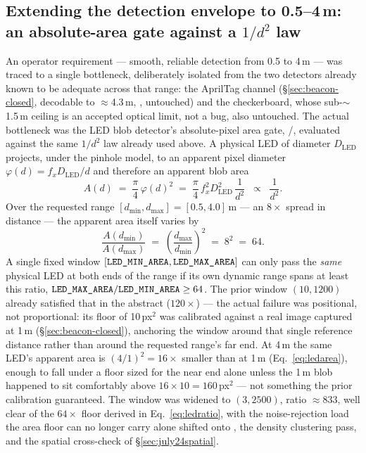 \subsection{Extending the detection envelope to 0.5--4\,m: an absolute-area
gate against a $1/d^2$ law}
\label{sec:july24range}
An operator requirement — smooth, reliable detection from 0.5 to 4\,m —
was traced to a single bottleneck, deliberately isolated from the two
detectors already known to be adequate across that range: the AprilTag
channel (\S\ref{sec:beacon-closed}, decodable to $\approx$4.3\,m,
, untouched) and the checkerboard, whose
sub-$\sim$1.5\,m ceiling is an accepted optical limit, not a bug, also
untouched. The actual bottleneck was the LED blob detector's absolute-pixel
area gate, /, evaluated against
the same $1/d^2$ law already used above. A physical LED of diameter
$D_{\text{LED}}$ projects, under the pinhole model, to an apparent pixel
diameter $\varphi(d) = f_x D_{\text{LED}}/d$ and therefore an apparent
blob area
\begin{equation}
A(d) \;=\; \frac{\pi}{4}\,\varphi(d)^2
\;=\; \frac{\pi}{4}\,f_x^2 D_{\text{LED}}^2 \,\frac{1}{d^2}
\;\;\propto\;\; \frac{1}{d^2}.
\label{eq:ledarea}
\end{equation}
Over the requested range $[d_{\min}, d_{\max}] = [0.5, 4.0]$\,m — an
$8\times$ spread in distance — the apparent area itself varies by
\begin{equation}
\frac{A(d_{\min})}{A(d_{\max})} \;=\; \left(\frac{d_{\max}}{d_{\min}}\right)^{2}
\;=\; 8^{2} \;=\; 64.
\label{eq:ledratio}
\end{equation}
A single fixed window $[\code{LED\_MIN\_AREA}, \code{LED\_MAX\_AREA}]$ can
only pass the \emph{same} physical LED at both ends of the range if its own
dynamic range spans at least this ratio,
$\code{LED\_MAX\_AREA}/\code{LED\_MIN\_AREA} \geq 64$. The prior window
$(10, 1200)$ already satisfied that in the abstract ($120\times$) — the
actual failure was positional, not proportional: its floor of 10\,px$^2$
was calibrated against a real image captured at 1\,m
(\S\ref{sec:beacon-closed}), anchoring the window around that single
reference distance rather than around the requested range's far end. At
4\,m the same LED's apparent area is $(4/1)^2 = 16\times$ smaller than at
1\,m (Eq.~\ref{eq:ledarea}), enough to fall under a floor sized for the
near end alone unless the 1\,m blob happened to sit comfortably above
$16 \times 10 = 160$\,px$^2$ — not something the prior calibration
guaranteed. The window was widened to $(3, 2500)$, ratio $\approx 833$,
well clear of the $64\times$ floor derived in Eq.~\ref{eq:ledratio}, with
the noise-rejection load the area floor can no longer carry alone shifted
onto , the density clustering pass, and the spatial
cross-check of \S\ref{sec:july24spatial}.

